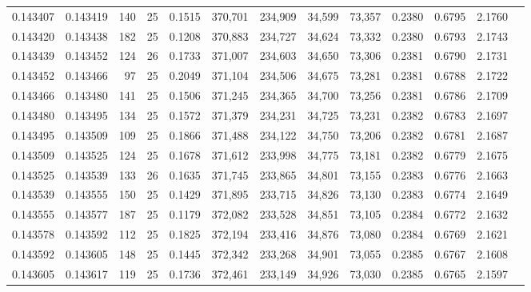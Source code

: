 \begin{tabular}{rrrrrrrrrrrrr}
0.143407 & 0.143419 &   140 &  25 &                                     0.1515 & 370,701 & 234,909 &  34,599 &  73,357 & 0.2380 & 0.6795 & 2.1760 \\
0.143420 & 0.143438 &   182 &  25 &                                     0.1208 & 370,883 & 234,727 &  34,624 &  73,332 & 0.2380 & 0.6793 & 2.1743 \\
0.143439 & 0.143452 &   124 &  26 &                                     0.1733 & 371,007 & 234,603 &  34,650 &  73,306 & 0.2381 & 0.6790 & 2.1731 \\
0.143452 & 0.143466 &    97 &  25 &                                     0.2049 & 371,104 & 234,506 &  34,675 &  73,281 & 0.2381 & 0.6788 & 2.1722 \\
0.143466 & 0.143480 &   141 &  25 &                                     0.1506 & 371,245 & 234,365 &  34,700 &  73,256 & 0.2381 & 0.6786 & 2.1709 \\
0.143480 & 0.143495 &   134 &  25 &                                     0.1572 & 371,379 & 234,231 &  34,725 &  73,231 & 0.2382 & 0.6783 & 2.1697 \\
0.143495 & 0.143509 &   109 &  25 &                                     0.1866 & 371,488 & 234,122 &  34,750 &  73,206 & 0.2382 & 0.6781 & 2.1687 \\
0.143509 & 0.143525 &   124 &  25 &                                     0.1678 & 371,612 & 233,998 &  34,775 &  73,181 & 0.2382 & 0.6779 & 2.1675 \\
0.143525 & 0.143539 &   133 &  26 &                                     0.1635 & 371,745 & 233,865 &  34,801 &  73,155 & 0.2383 & 0.6776 & 2.1663 \\
0.143539 & 0.143555 &   150 &  25 &                                     0.1429 & 371,895 & 233,715 &  34,826 &  73,130 & 0.2383 & 0.6774 & 2.1649 \\
0.143555 & 0.143577 &   187 &  25 &                                     0.1179 & 372,082 & 233,528 &  34,851 &  73,105 & 0.2384 & 0.6772 & 2.1632 \\
0.143578 & 0.143592 &   112 &  25 &                                     0.1825 & 372,194 & 233,416 &  34,876 &  73,080 & 0.2384 & 0.6769 & 2.1621 \\
0.143592 & 0.143605 &   148 &  25 &                                     0.1445 & 372,342 & 233,268 &  34,901 &  73,055 & 0.2385 & 0.6767 & 2.1608 \\
0.143605 & 0.143617 &   119 &  25 &                                     0.1736 & 372,461 & 233,149 &  34,926 &  73,030 & 0.2385 & 0.6765 & 2.1597 \\

\end{tabular}
